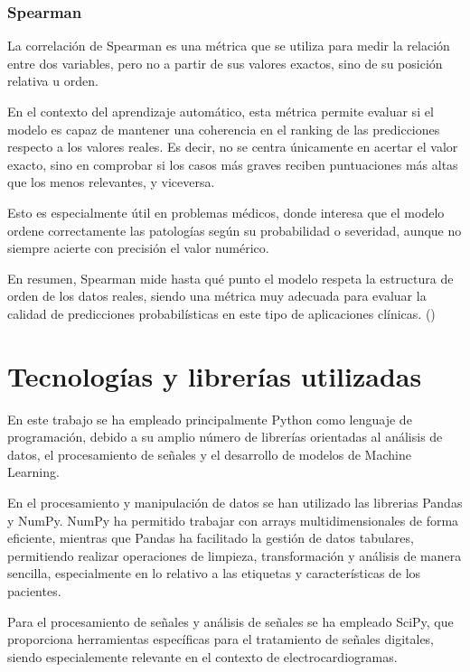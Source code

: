 \documentclass[12pt,a4paper,twoside]{book}
\begin{document}
\subsubsection*{Spearman}

La correlación de Spearman es una métrica que se utiliza para medir la relación entre dos variables, pero no a partir de sus valores exactos, sino de su posición relativa u orden.

En el contexto del aprendizaje automático, esta métrica permite evaluar si el modelo es capaz de mantener una coherencia en el ranking de las predicciones respecto a los valores reales. 
Es decir, no se centra únicamente en acertar el valor exacto, sino en comprobar si los casos más graves reciben puntuaciones más altas que los menos relevantes, y viceversa.

Esto es especialmente útil en problemas médicos, donde interesa que el modelo ordene correctamente las patologías según su probabilidad o severidad, aunque no siempre acierte con precisión el valor numérico.

En resumen, Spearman mide hasta qué punto el modelo respeta la estructura de orden de los datos reales, siendo una métrica muy adecuada para evaluar la calidad de predicciones probabilísticas en este tipo de aplicaciones clínicas. (\cite{wei2024_spearman})

\section{Tecnologías y librerías utilizadas}

En este trabajo se ha empleado principalmente Python como lenguaje de programación, debido a su amplio número de librerías orientadas al análisis de datos, el procesamiento de señales y el desarrollo de modelos de Machine Learning.

En el procesamiento y manipulación de datos se han utilizado las librerias Pandas y NumPy. 
NumPy ha permitido trabajar con arrays multidimensionales de forma eficiente, mientras que Pandas ha facilitado la gestión de datos tabulares, permitiendo realizar operaciones de limpieza, transformación y análisis de manera sencilla, especialmente en lo relativo a las etiquetas y características de los pacientes.

Para el procesamiento de señales y análisis de señales se ha empleado SciPy, que proporciona herramientas específicas para el tratamiento de señales digitales, siendo especialemente relevante en el contexto de electrocardiogramas.
\end{document}
